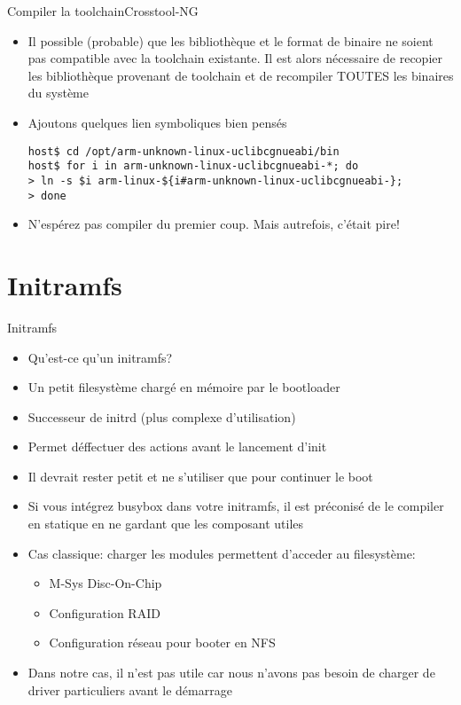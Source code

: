 \begin{frame}[fragile=singleslide]{Compiler la toolchain}{Crosstool-NG}
  \begin{itemize}
      \item Il  possible (probable) que les bibliothèque  et le format
        de  binaire  ne  soient   pas  compatible  avec  la  toolchain
        existante.    Il  est   alors  nécessaire   de   recopier  les
        bibliothèque  provenant de toolchain  et de  recompiler TOUTES
        les binaires du système
      \item Ajoutons quelques lien symboliques bien pensés
       \begin{lstlisting}[basicstyle=\ttfamily\scriptsize\color{colBasic}]
host$ cd /opt/arm-unknown-linux-uclibcgnueabi/bin
host$ for i in arm-unknown-linux-uclibcgnueabi-*; do 
> ln -s $i arm-linux-${i#arm-unknown-linux-uclibcgnueabi-}; 
> done
	\end{lstlisting}
      \item N'espérez  pas compiler  du premier coup.  Mais autrefois,
        c'était pire!
      \end{itemize}
\end{frame}


\section{Initramfs}

\begin{frame}[fragile=singleslide]{Initramfs}
  \begin{itemize}
  \item Qu'est-ce qu'un initramfs?
  \item Un petit filesystème chargé en mémoire par le bootloader
  \item Successeur de initrd (plus complexe d'utilisation)
  \item Permet déffectuer des actions avant le lancement d'init
  \item Il devrait rester petit et ne s'utiliser que pour continuer le
    boot
  \item  Si  vous  intégrez  busybox  dans  votre  initramfs,  il  est
    préconisé  de  le compiler  en  statique  en  ne gardant  que  les
    composant utiles
  \item  Cas classique:  charger les  modules permettent  d'acceder au
    filesystème:
    \begin{itemize}
    \item M-Sys Disc-On-Chip
    \item Configuration RAID
    \item Configuration réseau pour booter en NFS
    \end{itemize}
  \item Dans notre cas, il n'est pas utile car nous n'avons pas besoin
    de charger de driver particuliers avant le démarrage
  \end{itemize}
\end{frame}  

